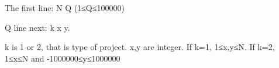 The first line: N Q (1≤Q≤100000)

Q line next: k x y.

k is 1 or 2, that is type of project. x,y are integer. If k=1, 1≤x,y≤N. If k=2, 1≤x≤N and -1000000≤y≤1000000